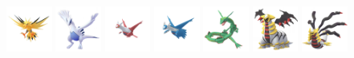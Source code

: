 \documentclass[12pt]{beamer}
\begin{document}
\begin{frame}[label=Ice]
\begin{footnotesize}
\begin{block}{}
\begin{center}
    \includegraphics[width=1.5cm]{../../images/pokemon/zapdos.png}
    \includegraphics[width=1.5cm]{../../images/pokemon/lugia.png}
    \includegraphics[width=1.5cm]{../../images/pokemon/latias.png}
    \includegraphics[width=1.5cm]{../../images/pokemon/latios.png}
    \includegraphics[width=1.5cm]{../../images/pokemon/rayquaza.png}
    \includegraphics[width=1.5cm]{../../images/pokemon/giratina_a.png}
    \includegraphics[width=1.5cm]{../../images/pokemon/giratina_o.png}
\end{center}
\end{block}

\end{footnotesize}
\end{frame}

\end{document}

